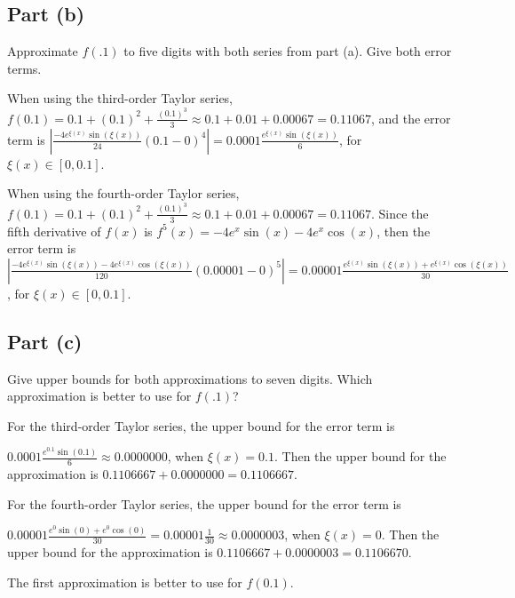 \subsection{Part (b)}

\begin{question}
    Approximate $f(.1)$ to five digits with both series from part (a). Give both error terms.
\end{question}

\begin{answer}
    When using the third-order Taylor series, $f(0.1) = 0.1 + (0.1)^2 + \tfrac{(0.1)^3}{3} \approx 0.1 + 0.01 + 0.00067 = 0.11067$, and the error term is $\left\lvert \tfrac{-4e^{\xi(x)}\sin{(\xi(x))}}{24}(0.1-0)^4\right\rvert = 0.0001\tfrac{e^{\xi(x)}\sin{(\xi(x))}}{6}$, for $\xi(x) \in [0,0.1]$.
    
    When using the fourth-order Taylor series, $f(0.1) = 0.1 + (0.1)^2 + \tfrac{(0.1)^3}{3} \approx 0.1 + 0.01 + 0.00067 = 0.11067$. Since the fifth derivative of $f(x)$ is $f^{5}(x) = -4e^x\sin{(x)} - 4e^x\cos{(x)}$, then the error term is $\left \lvert\tfrac{-4e^{\xi(x)}\sin{(\xi(x))} - 4e^{\xi(x)}\cos{(\xi(x))}}{120}(0.00001-0)^5\right\rvert = 0.00001\tfrac{e^{\xi(x)}\sin{(\xi(x))} + e^{\xi(x)}\cos{(\xi(x))}}{30}$, for $\xi(x) \in [0,0.1]$.
\end{answer}

\subsection{Part (c)}

\begin{question}
   Give upper bounds for both approximations to seven digits. Which approximation is better to use for $f(.1)$?
\end{question}

\begin{answer}
    For the third-order Taylor series, the upper bound for the error term is 
    
    $0.0001\tfrac{e^{0.1}\sin{(0.1)}}{6} \approx 0.0000000$, when $\xi(x) = 0.1$. Then the upper bound for the approximation is $0.1106667+0.0000000 = 0.1106667$.
    
    For the fourth-order Taylor series, the upper bound for the error term is 
    
    $0.00001\tfrac{e^{0}\sin{(0)} + e^{0}\cos{(0)}}{30} = 0.00001\tfrac{1}{30} \approx 0.0000003$, when $\xi(x) = 0$. Then the upper bound for the approximation is $0.1106667 + 0.0000003 = 0.1106670$.
    
    The first approximation is better to use for $f(0.1)$.
\end{answer}

